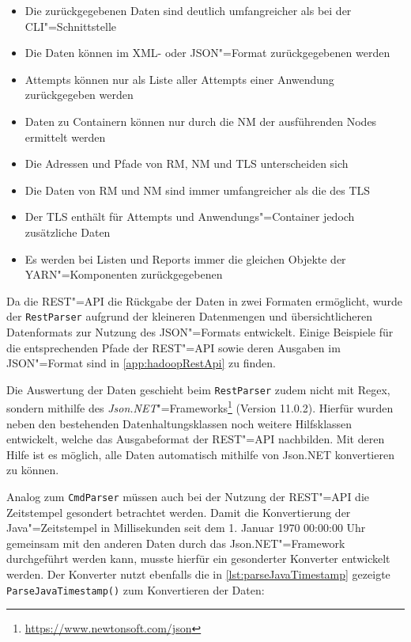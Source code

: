 \begin{itemize}
    \item Die zurückgegebenen Daten sind deutlich umfangreicher als bei der \gls{CLI}"=Schnittstelle
    \item Die Daten können im XML- oder JSON"=Format zurückgegebenen werden
    \item Attempts können nur als Liste aller Attempts einer Anwendung zurückgegeben werden
    \item Daten zu Containern können nur durch die \gls{NM} der ausführenden Nodes ermittelt werden
    \item Die Adressen und Pfade von \gls{RM}, \gls{NM} und \gls{TLS} unterscheiden sich
    \item Die Daten von \gls{RM} und \gls{NM} sind immer umfangreicher als die des \gls{TLS}
    \item Der \gls{TLS} enthält für Attempts und Anwendungs"=Container jedoch zusätzliche Daten
    \item Es werden bei Listen und Reports immer die gleichen Objekte der YARN"=Komponenten zurückgegebenen
\end{itemize}

Da die REST"=API die Rückgabe der Daten in zwei Formaten ermöglicht, wurde der \texttt{RestParser} aufgrund der kleineren Datenmengen und übersichtlicheren Datenformats zur Nutzung des JSON"=Formats entwickelt.
Einige Beispiele für die entsprechenden Pfade der REST"=API sowie deren Ausgaben im JSON"=Format sind in \cref{app:hadoopRestApi} zu finden.

Die Auswertung der Daten geschieht beim \texttt{RestParser} zudem nicht mit Regex, sondern mithilfe des \emph{Json.NET}"=Frameworks\footnote{\url{https://www.newtonsoft.com/json}} (Version 11.0.2).
Hierfür wurden neben den bestehenden Datenhaltungsklassen noch weitere Hilfsklassen entwickelt, welche das Ausgabeformat der REST"=API nachbilden.
Mit deren Hilfe ist es möglich, alle Daten automatisch mithilfe von Json.NET konvertieren zu können.

Analog zum \texttt{CmdParser} müssen auch bei der Nutzung der REST"=API die Zeitstempel gesondert betrachtet werden.
Damit die Konvertierung der Java"=Zeitstempel in Millisekunden seit dem 1. Januar 1970 00:00:00 Uhr gemeinsam mit den anderen Daten durch das Json.NET"=Framework durchgeführt werden kann, musste hierfür ein gesonderter Konverter entwickelt werden.
Der Konverter nutzt ebenfalls die in \cref{lst:parseJavaTimestamp} gezeigte \texttt{ParseJavaTimestamp()} zum Konvertieren der Daten:

